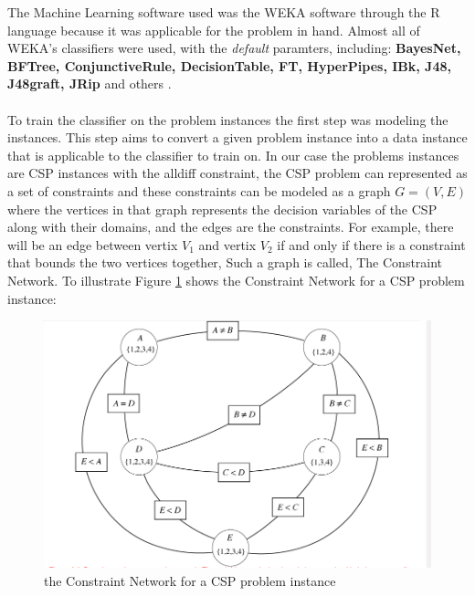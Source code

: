 The Machine Learning software used was the WEKA software through the R language because it was applicable for the problem in hand. Almost all of WEKA's classifiers were used, with the \textit{default} paramters, including: \textbf{BayesNet, BFTree, ConjunctiveRule, DecisionTable, FT, HyperPipes, IBk, J48, J48graft, JRip} and others \cite{ml:csd}.
\\\\
To train the classifier on the problem instances the first step was modeling the instances. This step aims to convert a given problem instance into a data instance that is applicable to the classifier to train on. In our case the problems instances are CSP instances with the alldiff constraint, the CSP problem can represented as a set of constraints and these constraints can be modeled as a graph $G=(V,E)$ where the vertices in that graph represents the decision variables of the CSP along with their domains, and the edges are the constraints. For example, there will be an edge between vertix $V_{1}$ and vertix $V_{2}$ if and only if there is a constraint that bounds the two vertices together, Such a graph is called, The Constraint Network. To illustrate Figure \ref{cs:nw} shows the Constraint Network for a CSP problem instance:
\begin{figure}[h!]
  \vspace{1 cm}
  \includegraphics[width=1.0\textwidth]{images/constraint_nw.png}
  \caption[ ]{the Constraint Network for a CSP problem instance}
  \label{cs:nw}
\end{figure}

